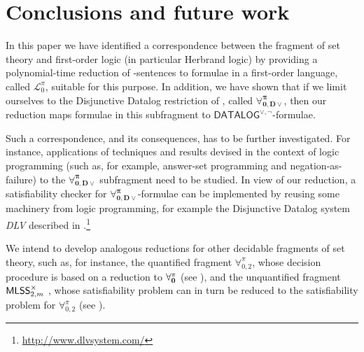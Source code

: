\documentclass[manyauthors]{fundam}
\newcommand{\DisjDatalog}{\ensuremath{\mathsf{DATALOG}^{\vee,\neg}}\xspace}
\newcommand{\ForallpizeroDisjDatalog}{\ensuremath{\mathbf{\forall_{0,D\vee}^{\pi}}}\xspace}
\newcommand{\Elpizero}{\ensuremath{\mathcal{L}_{0}^{\pi}}\xspace}
\begin{document}
\section{Conclusions and future work}\label{CONCLUSIONS}

In this paper we have identified a correspondence between the fragment
of set theory \Forallpizero and first-order logic (in particular
Herbrand logic) by providing a polynomial-time reduction of
\Forallpizero-sentences to formulae in a first-order language, called
\Elpizero, suitable for this purpose.  In addition, we have shown that
if we limit ourselves to the Disjunctive Datalog restriction of
\Forallpizero, called \ForallpizeroDisjDatalog, then our reduction maps
formulae in this subfragment to \DisjDatalog-formulae.

Such a correspondence, and its consequences, has to be further
investigated.  For instance, applications of techniques and results
devised in the context of logic programming (such as, for example,
answer-set programming and negation-as-failure) to the
\ForallpizeroDisjDatalog subfragment need to be studied.  In view of
our reduction, a satisfiability checker for
\ForallpizeroDisjDatalog-formulae can be implemented by reusing some
machinery from logic programming, for example the Disjunctive Datalog
system \emph{DLV} described in
\cite{AlvFabLeoPerPfeTer2011}.\footnote{\url{http://www.dlvsystem.com/}}

We intend to develop analogous reductions for other decidable
fragments of set theory, such as, for instance, the quantified
fragment $\forall_{0,2}^{\pi}$, whose decision procedure is based on 
a reduction to $\mathbf{\forall_{0}^{\pi}}$ (see \cite{CanLon2012}), and the
unquantified fragment $\mathsf{MLSS}_{2,m}^{\times}$ , whose
satisfiability problem can in turn be reduced to the satisfiability
problem for $\forall_{0,2}^{\pi}$ (see \cite{CanLonNic2010}).





\end{document}

